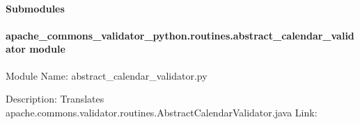 \documentclass[letterpaper,10pt,english]{sphinxmanual}
\begin{document}
\paragraph{Submodules}
\label{\detokenize{apache_commons_validator_python.routines:submodules}}

\paragraph{apache\_commons\_validator\_python.routines.abstract\_calendar\_validator module}
\label{\detokenize{apache_commons_validator_python.routines:module-apache_commons_validator_python.routines.abstract_calendar_validator}}\label{\detokenize{apache_commons_validator_python.routines:apache-commons-validator-python-routines-abstract-calendar-validator-module}}
\sphinxAtStartPar
Module Name: abstract\_calendar\_validator.py

\sphinxAtStartPar
Description: Translates apache.commons.validator.routines.AbstractCalendarValidator.java
Link: 
\end{document}
